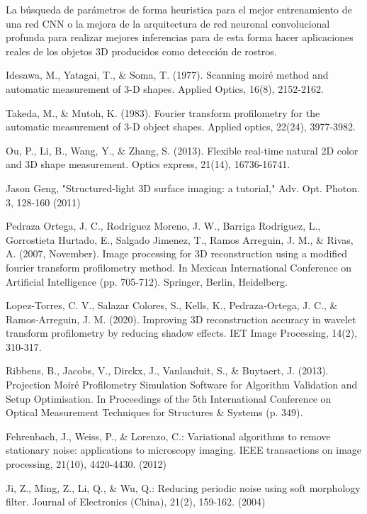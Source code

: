\documentclass[10pt,letterpaper]{article}
\begin{document}
La búsqueda de parámetros de forma heuristica para el mejor entrenamiento de una red CNN o la mejora de la arquitectura de red neuronal convolucional profunda para realizar mejores inferencias para de esta forma hacer aplicaciones reales de los objetos 3D producidos como detección de rostros.
\newpage
\begin{thebibliography}{0}

Idesawa, M., Yatagai, T., \& Soma, T. (1977). Scanning moiré method and automatic measurement of 3-D shapes. Applied Optics, 16(8), 2152-2162.

Takeda, M., \& Mutoh, K. (1983). Fourier transform profilometry for the automatic measurement of 3-D object shapes. Applied optics, 22(24), 3977-3982.

Ou, P., Li, B., Wang, Y., \& Zhang, S. (2013). Flexible real-time natural 2D color and 3D shape measurement. Optics express, 21(14), 16736-16741.

Jason Geng, "Structured-light 3D surface imaging: a tutorial," Adv. Opt. Photon. 3, 128-160 (2011)

Pedraza Ortega, J. C., Rodriguez Moreno, J. W., Barriga Rodriguez, L., Gorrostieta Hurtado, E., Salgado Jimenez, T., Ramos Arreguin, J. M., \& Rivas, A. (2007, November). Image processing for 3D reconstruction using a modified fourier transform profilometry method. In Mexican International Conference on Artificial Intelligence (pp. 705-712). Springer, Berlin, Heidelberg.

Lopez‐Torres, C. V., Salazar Colores, S., Kells, K., Pedraza‐Ortega, J. C., \& Ramos‐Arreguin, J. M. (2020). Improving 3D reconstruction accuracy in wavelet transform profilometry by reducing shadow effects. IET Image Processing, 14(2), 310-317.

Ribbens, B., Jacobs, V., Dirckx, J., Vanlanduit, S., \& Buytaert, J. (2013). Projection Moiré Profilometry Simulation Software for Algorithm Validation and Setup Optimisation. In Proceedings of the 5th International Conference on Optical Measurement Techniques for Structures \& Systems (p. 349).

Fehrenbach, J., Weiss, P., \& Lorenzo, C.: Variational algorithms to remove stationary noise: applications to microscopy imaging. IEEE transactions on image processing, 21(10), 4420-4430. (2012)

Ji, Z., Ming, Z., Li, Q., \& Wu, Q.: Reducing periodic noise using soft morphology filter. Journal of Electronics (China), 21(2), 159-162. (2004)


\end{thebibliography}
\end{document}
